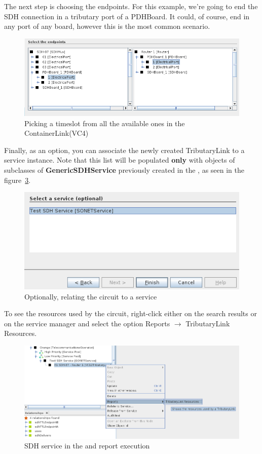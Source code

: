 \documentclass[a4paper]{article}
\begin{document}
		The next step is choosing the endpoints. For this example, we're going to end the SDH connection in a tributary port of a PDHBoard. It could, of course, end in any port of any board, however this is the most common scenario.
		\begin{figure}[h!]
			\centering
			\includegraphics[width=\linewidth]{img/sdh_module_tributary_link_step_4.png}
			\caption{Picking a timeslot from all the available ones in the ContainerLink(VC4)}
			\label{fig:sdh_module_tributary_link_step_4}
		\end{figure}
		\newpage
		Finally, as an option, you can associate the newly created TributaryLink to a service instance. Note that this list will be populated \textbf{only} with objects of subclasses of \textbf{GenericSDHService} previously created in the , as seen in the figure~\ref{fig:sdh_module_tributary_link_service_report}.
		\begin{figure}[h!]
			\centering
			\includegraphics[width=0.7\linewidth]{img/sdh_module_tributary_link_step_5.png}
			\caption{Optionally, relating the circuit to a service}
			\label{fig:sdh_module_tributary_link_step_5}
		\end{figure}
		
		To see the resources used by the circuit, right-click either on the search results or on the service manager and select the option Reports $\rightarrow$ TributaryLink Resources.
		\begin{figure}[h!]
			\centering
			\includegraphics[width=\linewidth]{img/sdh_module_tributary_link_service_report.png}
			\caption{SDH service in the  and report execution}
			\label{fig:sdh_module_tributary_link_service_report}
		\end{figure}
		
\end{document}
